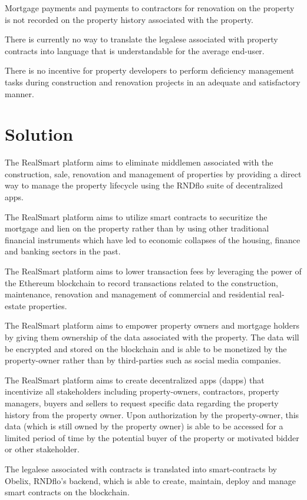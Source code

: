 \documentclass{article}
\begin{document}
Mortgage payments and payments to contractors for renovation on the property is not recorded on the 
property history associated with the property.


There is currently no way to translate the legalese associated with property contracts into language 
that is understandable for the average end-user.


There is no incentive for property developers to perform deficiency management tasks during 
construction and renovation projects in an adequate and satisfactory manner.


\section{Solution}


The RealSmart platform aims to eliminate middlemen associated with the construction, sale, renovation and 
management of properties by providing a direct way to manage the property lifecycle using the 
RNDflo suite of decentralized apps.


The RealSmart platform aims to utilize smart contracts to securitize the mortgage and lien on the property 
rather than by using other traditional financial instruments which have led to economic collapses 
of the housing, finance and banking sectors in the past.


The RealSmart platform aims to lower transaction fees by leveraging the power of the Ethereum blockchain to 
record transactions related to the construction, maintenance, renovation and management of 
commercial and residential real-estate properties.


The RealSmart platform aims to empower property owners and mortgage holders by giving them ownership of the 
data associated with the property. The data will be encrypted and stored on the blockchain and 
is able to be monetized by the property-owner rather than by third-parties such as social media companies.


The RealSmart platform aims to create decentralized apps (dapps) that incentivize all stakeholders including 
property-owners, contractors, property managers, buyers and sellers to request specific data 
regarding the property history from the property owner. Upon authorization by the property-owner, 
this data (which is still owned by the property owner) is able to be accessed for a limited period of 
time by the potential buyer of the property or motivated bidder or other stakeholder.


The legalese associated with contracts is translated into smart-contracts by Obelix, 
RNDflo’s backend, which is able to create, maintain, deploy and manage smart contracts on the blockchain.
\end{document}
